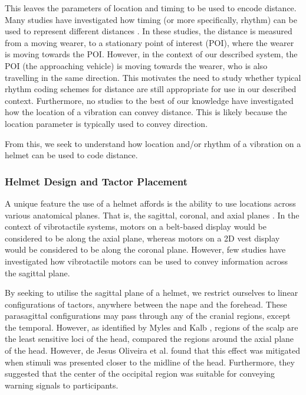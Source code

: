 \documentclass{mpaper}
\begin{document}
This leaves the parameters of location and timing to be used to encode distance. Many studies have investigated how timing (or more specifically, rhythm) can be used to represent different distances \cite{10.1145/1060581.1060585, 5326374, 10.1145/1520340.1520718, 10.1145/1753326.1753581, 10.1145/1868914.1868923}. In these studies, the distance is measured from a moving wearer, to a stationary point of interest (POI), where the wearer is moving towards the POI. However, in the context of our described system, the POI (the approaching vehicle) is moving towards the wearer, who is also travelling in the same direction. This motivates the need to study whether typical rhythm coding schemes for distance are still appropriate for use in our described context. Furthermore, no studies to the best of our knowledge have investigated how the location of a vibration can convey distance. This is likely because the location parameter is typically used to convey direction.

From this, we seek to understand how location and/or rhythm of a vibration on a helmet can be used to code distance.

\subsubsection{Helmet Design and Tactor Placement}\label{sec:helmet-design}
A unique feature the use of a helmet affords is the ability to use locations across various anatomical planes. That is, the sagittal, coronal, and axial planes \cite{anatomical}. In the context of vibrotactile systems, motors on a belt-based display \cite{10.1145/1613858.1613911, 10.1145/2449396.2449450, 10.1145/1060581.1060585} would be considered to be along the axial plane, whereas motors on a 2D vest display \cite{729547, 998954, van2000tactile} would be considered to be along the coronal plane. However, few studies have investigated how vibrotactile motors can be used to convey information across the sagittal plane.

By seeking to utilise the sagittal plane of a helmet, we restrict ourselves to linear configurations of tactors, anywhere between the nape and the forehead. These parasagittal configurations may pass through any of the cranial regions, except the temporal. However, as identified by Myles and Kalb \cite{headguidelines}, regions of the scalp are the least sensitive loci of the head, compared the regions around the axial plane of the head. However, de Jesus Oliveira et al. \cite{7463147} found that this effect was mitigated when stimuli was presented closer to the midline of the head. Furthermore, they suggested that the center of the occipital region was suitable for conveying warning signals to participants.
\end{document}
